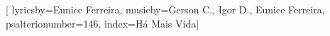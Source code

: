 %

\setcounter{songnum}{146}

[
        lyricsby={Eunice Ferreira}, 
        musicby={Gerson C., Igor D., Eunice Ferreira},
        psalterionumber=146,
        index={Há Mais Vida}]

